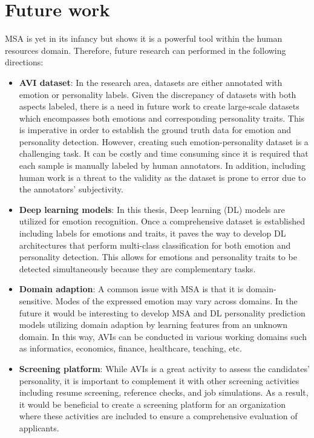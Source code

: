 \section{Future work}
\label{sec:future_work}
MSA is yet in its infancy but shows it is a powerful tool within the human resources domain. Therefore, future research can performed in the following directions:
\begin{itemize}
    \item \textbf{AVI dataset}: In the research area, datasets are either annotated with emotion or personality labels. Given the discrepancy of datasets with both aspects labeled, there is a need in future work to create large-scale datasets which encompasses both emotions and corresponding personality traits. This is imperative in order to establish the ground truth data for emotion and personality detection. However, creating such emotion-personality dataset is a challenging task. It can be costly and time consuming since it is required that each sample is manually labeled by human annotators. In addition, including human work is a threat to the validity as the dataset is prone to error due to the annotators' subjectivity. \\ 
    \item \textbf{Deep learning models}: In this thesis, Deep learning (DL) models are utilized for emotion recognition. Once a comprehensive dataset is established including labels for emotions and traits, it paves the way to develop DL architectures that perform multi-class classification for both emotion and personality detection. This allows for emotions and personality traits to be detected simultaneously because they are complementary tasks. \\
    \item \textbf{Domain adaption}: A common issue with MSA is that it is domain-sensitive. Modes of the expressed emotion may vary across domains. In the future it would be interesting to develop MSA and DL personality prediction models utilizing domain adaption by learning features from an unknown domain. In this way, AVIs can be conducted in various working domains such as informatics, economics, finance, healthcare, teaching, etc. \\
    \item  \textbf{Screening platform}: While AVIs is a great activity to assess the candidates' personality, it is important to complement it with other screening activities including resume screening, reference checks, and job simulations. As a result, it would be beneficial to create a screening platform for an organization where these activities are included to ensure a comprehensive evaluation of applicants. 
\end{itemize}



